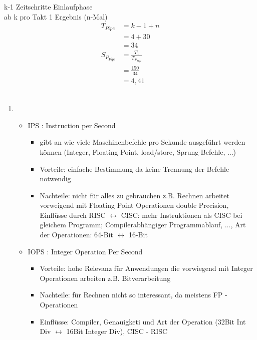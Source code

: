 \bigskip

k-1 Zeitschritte Einlaufphase \\
ab k pro Takt 1 Ergebnis (n-Mal)\\
\begin{align*}
	T_{Pipe} &= k-1 +n \\
	&= 4 + 30 \\
	&= 34 \\
	S_{P_{Pipe}} &= \frac{T_1}{T_{P_{Pipe}}}\\
	&= \frac{150}{34} \\
	&= 4,41 \\
\end{align*}
\subsection{}
\begin{enumerate}
	\item
	\begin{itemize}
		\item IPS : Instruction per Second
		\begin{itemize}
			\item gibt an wie viele Maschinenbefehle pro Sekunde ausgeführt werden können (Integer, Floating Point, load/store, Sprung-Befehle, ...)
			\item Vorteile: einfache Bestimmung da keine Trennung der Befehle notwendig
			\item Nachteile: nicht für alles zu gebrauchen z.B. Rechnen arbeitet vorweigend mit Floating Point Operationen double Precision, Einflüsse durch RISC \(\leftrightarrow\) CISC: mehr Instruktionen als CISC bei gleichem Programm; Compilerabhängiger Programmablauf, ..., Art der Operationen: 64-Bit \(\leftrightarrow\) 16-Bit
		\end{itemize}
		\item IOPS : Integer Operation Per Second
		\begin{itemize}
			\item Vorteile: hohe Relevanz für Anwendungen die vorwiegend mit Integer Operationen arbeiten z.B. Bitverarbeitung
			\item Nachteile: für Rechnen nicht so interessant, da meistens FP - Operationen
			\item Einflüsse: Compiler, Genauigketi und Art der Operation (32Bit Int Div \(\leftrightarrow\) 16Bit Integer Div), CISC - RISC
		\end{itemize}
	\end{itemize}
\end{enumerate}
